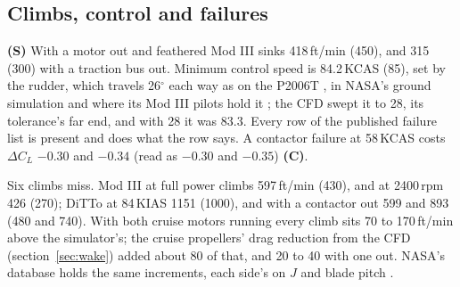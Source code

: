 \documentclass[10pt,a4paper,twocolumn]{article}
\begin{document}
\subsection{Climbs, control and failures}
\textbf{(S)} With a motor out and feathered Mod III sinks 418\,ft/min (450), and 315 (300) with a traction bus out. Minimum control speed is 84.2\,KCAS (85), set by the rudder, which travels 26$^\circ$ each way as on the P2006T \cite{afm}, in NASA's ground simulation \cite{gd} and where its Mod III pilots hold it \cite{cm}; the CFD swept it to 28, its tolerance's far end, and with 28 it was 83.3. Every row of the published failure list \cite{sim3} is present and does what the row says. A contactor failure at 58\,KCAS costs $\Delta C_L$ $-0.30$ and $-0.34$ (read as $-0.30$ and $-0.35$) \textbf{(C)}.

Six climbs miss. Mod III at full power climbs 597\,ft/min (430), and at 2400\,rpm 426 (270); DiTTo at 84\,KIAS 1151 (1000), and with a contactor out 599 and 893 (480 and 740). With both cruise motors running every climb sits 70 to 170\,ft/min above the simulator's; the cruise propellers' drag reduction from the CFD (section~\ref{sec:wake}) added about 80 of that, and 20 to 40 with one out. NASA's database holds the same increments, each side's on $J$ and blade pitch \cite{tm}.
\end{document}
